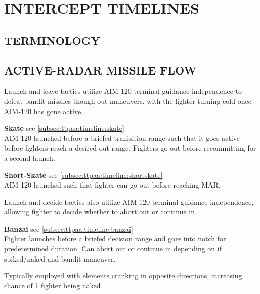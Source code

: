 \section{INTERCEPT TIMELINES}

\subsection{TERMINOLOGY}

\begin{tcoloritemize}
    \blueitem[Contact]
    \blueitem[Group]
    \blueitem[Picture]
\end{tcoloritemize}

\subsection[AR FLOW]{ACTIVE-RADAR MISSILE FLOW}

\begin{tcoloritemize}
    Launch-and-leave tactics utilize AIM-120 terminal guidance independence 
    to defeat bandit missiles though out maneuvers, 
    with the fighter turning cold once AIM-120 has gone active.

    \bigskip
    \textbf{Skate} \hfill see \cref{subsec:ttpaa:timeline:skate}\\
    AIM-120 launched before a briefed tranisition range 
    such that it goes active before fighters reach a desired out range.
    Fighters go out before recommitting for a second launch.
    
    \bigskip
    \textbf{Short-Skate} \hfill see \cref{subsec:ttpaa:timeline:shortskate}\\
    AIM-120 launched such that fighter can go out before reaching MAR.

    Launch-and-decide tactics also utilize AIM-120 terminal guidance independence, 
    allowing fighter to decide whether to abort out or continue in.

    \bigskip
    \textbf{Banzai} \hfill see \cref{subsec:ttpaa:timeline:banzai}\\
    Fighter launches before a briefed decision range and goes into notch for predetermined duration. 
    Can abort out or continue in depending on if spiked/naked and bandit maneuver.

    Typically employed with elements cranking in opposite directions, increasing chance of 1 fighter being naked
\end{tcoloritemize}


